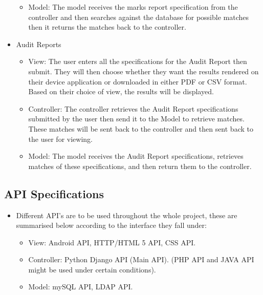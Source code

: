 \documentclass[12pt]{article}
\begin{document}
\begin{itemize}
\begin{itemize}
							\item Model: The model receives the marks report specification from the controller and then searches against the database for possible matches then it returns the matches back to the controller.
						\end{itemize}
					\item Audit Reports
						\begin{itemize}
							\item View: The user enters all the specifications for the Audit Report then submit. They will then choose whether they want the results rendered on their device application or downloaded in either PDF or CSV format. Based on their choice of view, the results will be displayed.
							\item Controller: The controller retrieves the Audit Report specifications submitted by the user then send it to the Model to retrieve matches. These matches will be sent back to the controller and then sent back to the user for viewing.
							\item Model: The model receives the Audit Report specifications, retrieves matches of these specifications, and then return them to the controller.
						\end{itemize}
				\end{itemize}
		\vspace{0.2in}
		
		\subsection{API Specifications}
						\begin{itemize}
				\item Different API's are to be used throughout the whole project, these are summarised below according to the interface they fall under:
					\begin{itemize}
                                                \item View: Android API, HTTP/HTML 5 API, CSS API.
						\item Controller: Python Django API (Main API). (PHP API and JAVA API might be used under certain conditions).
						\item Model: mySQL API, LDAP API.
					\end{itemize}
			
		\end{itemize}
				\vspace{0.2in}
				
\end{document}
